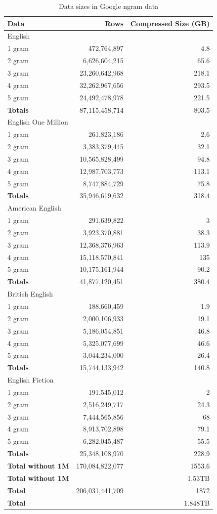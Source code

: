 \documentclass[a4paper]{tufte-handout}
\begin{document}
\begin{table}[p]
\label{tab:ngram-sizes}
\centering
\caption{Data sizes in Google ngram data} 
\begin{tabular}{lrr} 
\toprule
Data 	&	Rows &	Compressed Size (GB)\\
\midrule
English\\
\midrule
1 gram &	472,764,897 &	4.8\\
2 gram &	6,626,604,215 &	65.6\\
3 gram &	23,260,642,968 &	218.1\\
4 gram &	32,262,967,656 &	293.5\\
5 gram &	24,492,478,978 &	221.5\\
\textbf{Totals} &	87,115,458,714 &	803.5\\
\midrule
English One Million\\
\midrule
1 gram &	261,823,186 &	2.6\\
2 gram &	3,383,379,445 &	32.1\\
3 gram &	10,565,828,499 &	94.8\\
4 gram &	12,987,703,773 &	113.1\\
5 gram &	8,747,884,729 &	75.8\\
\textbf{Totals} &	35,946,619,632 &	318.4\\
\midrule
American English\\
\midrule
1 gram &	291,639,822 &	3\\
2 gram &	3,923,370,881 &	38.3\\
3 gram &	12,368,376,963 &	113.9\\
4 gram &	15,118,570,841 &	135\\
5 gram &	10,175,161,944 &	90.2\\
\textbf{Totals} &	41,877,120,451 &	380.4\\
\midrule
British English\\
\midrule
1 gram &	188,660,459 &	1.9\\
2 gram &	2,000,106,933 &	19.1\\
3 gram &	5,186,054,851 &	46.8\\
4 gram &	5,325,077,699 &	46.6\\
5 gram &	3,044,234,000 &	26.4\\
\textbf{Totals} &	15,744,133,942 &	140.8\\
\midrule
English Fiction\\
\midrule
1 gram	&	191,545,012	&	2\\
2 gram	&	2,516,249,717	&	24.3\\
3 gram	&	7,444,565,856	&	68\\
4 gram	&	8,913,702,898	&	79.1\\
5 gram	&	6,282,045,487	&	55.5\\
\textbf{Totals}	& 25,348,108,970	&	228.9\\
\midrule
\textbf{Total without 1M}  &	170,084,822,077 &	1553.6\\
\textbf{Total without 1M} &  &	1.53TB\\
\textbf{Total}	& 206,031,441,709 &	1872\\
\textbf{Total}	& &	1.848TB\\
\end{tabular}
\end{table}
\end{document}
